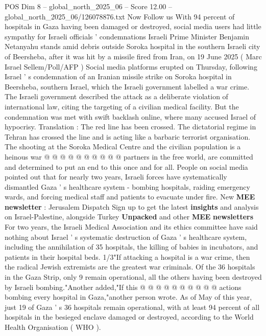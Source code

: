 \begin{textsample}{POS Dim 8 – global\_north\_2025\_06 – Score 12.00 – global\_north\_2025\_06/126078876.txt}  \label{ex:f8_pos_047}
Now Follow us With 94 percent of hospitals in Gaza having been damaged or destroyed, social media users had little sympathy for Israeli officials ' condemnations Israeli Prime Minister Benjamin Netanyahu stands amid debris outside Soroka hospital in the southern Israeli city of Beersheba, after it was hit by a missile fired from Iran, on 19 June 2025 ( Marc Israel Sellem/Poll/AFP ) Social media platforms erupted on Thursday, following Israel ' s condemnation of an Iranian missile strike on Soroka hospital in Beersheba, southern Israel, which the Israeli government labelled a war crime.
The Israeli government described the attack as a deliberate violation of international law, citing the targeting of a civilian medical facility.
But the condemnation was met with swift backlash online, where many accused Israel of hypocrisy.
Translation : The red line has been crossed.
The dictatorial regime in Tehran has crossed the line and is acting like a barbaric terrorist organisation.
The shooting at the Soroka Medical Centre and the civilian population is a heinous war @ @ @ @ @ @ @ @ @ @ partners in the free world, are committed and determined to put an end to this once and for all.
People on social media pointed out that for nearly two years, Israeli forces have systematically dismantled Gaza ' s healthcare system - bombing hospitals, raiding emergency wards, and forcing medical staff and patients to evacuate under fire.
New \textbf{MEE} \textbf{newsletter} : Jerusalem Dispatch Sign up to get the latest \textbf{insights} and analysis on Israel-Palestine, alongside Turkey \textbf{Unpacked} and other \textbf{MEE} \textbf{newsletters} For two years, the Israeli Medical Association and its ethics committee have said nothing about Israel ' s systematic destruction of Gaza ' s healthcare system, including the annihilation of 35 hospitals, the killing of babies in incubators, and patients in their hospital beds. 1/3"If attacking a hospital is a war crime, then the radical Jewish extremists are the greatest war criminals.
Of the 36 hospitals in the Gaza Strip, only 9 remain operational, all the others having been destroyed by Israeli bombing."Another added,"If this @ @ @ @ @ @ @ @ @ @ actions bombing every hospital in Gaza,"another person wrote.
As of May of this year, just 19 of Gaza ' s 36 hospitals remain operational, with at least 94 percent of all hospitals in the besieged enclave damaged or destroyed, according to the World Health Organisation ( WHO ).

\end{textsample}
